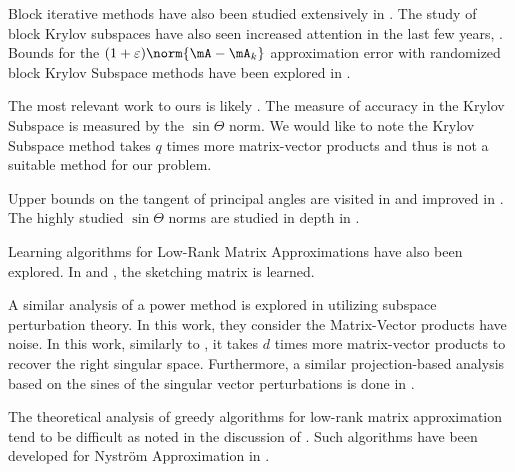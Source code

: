 \documentclass[10pt]{article}
\theoremstyle{plain}
\theoremstyle{definition}
\theoremstyle{remark}
\begin{document}
Block iterative methods have also been studied extensively in \cite{halko:2011b}. The study of block Krylov subspaces have also seen increased attention in the last few years, \cite{tropp:2023}. Bounds for the $(1 + \varepsilon)\norm{\mA - \mA_k}$ approximation error with randomized block Krylov Subspace methods have been explored in \cite{musco:2015,bakshi:2022}.

The most relevant work to ours is likely \cite{drineas:2018}. The measure of accuracy in the Krylov Subspace is measured by the $\sin\Theta$ norm. We would like to note the Krylov Subspace method takes $q$ times more matrix-vector products and thus is not a suitable method for our problem. 

Upper bounds on the tangent of principal angles are visited in \cite{nakatsukasa:2012} and improved in \cite{massey:2020}. The highly studied $\sin\Theta$ norms are studied in depth in \cite{cai:2018,orourke:2018}.

Learning algorithms for Low-Rank Matrix Approximations have also been explored. In \cite{indyk:2021} and \cite{indyk:2019}, the sketching matrix is learned. 

A similar analysis of a power method is explored in \cite{hardt:2014} utilizing subspace perturbation theory. In this work, they consider the Matrix-Vector products have noise. In this work, similarly to \cite{drineas:2018}, it takes $d$ times more matrix-vector products to recover the right singular space. Furthermore, a similar projection-based analysis based on the sines of the singular vector perturbations is done in \cite{luo:2021}.

The theoretical analysis of greedy algorithms for low-rank matrix approximation tend to be difficult as noted in the discussion of \cite{gittens:2016}. Such algorithms have been developed for Nystr\"om Approximation in \cite{farahat:2011,kumar:2012}.
\end{document}
